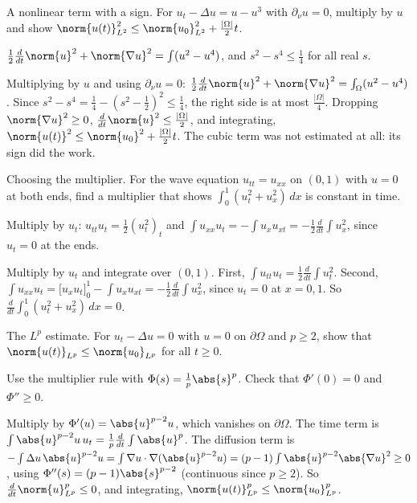 \begin{exercise}
  A nonlinear term with a sign. For $u_t - \Delta u = u - u^3$ with $\partial_\nu u = 0$, multiply by $u$ and show $\norm{u(t)}_{L^2}^2 \le \norm{u_0}_{L^2}^2 + \frac{|\Omega|}{2}t$.
  \begin{hint}
    $\frac12\frac{d}{dt}\norm{u}^2 + \norm{\nabla u}^2 = \int(u^2 - u^4)$, and $s^2 - s^4 \le \frac14$ for all real $s$.
  \end{hint}
  \begin{solution}
    Multiplying by $u$ and using $\partial_\nu u = 0$: $\frac12\frac{d}{dt}\norm{u}^2 + \norm{\nabla u}^2 = \int_\Omega(u^2 - u^4)$. Since $s^2 - s^4 = \frac14 - (s^2 - \frac12)^2 \le \frac14$, the right side is at most $\frac{|\Omega|}{4}$. Dropping $\norm{\nabla u}^2 \ge 0$, $\frac{d}{dt}\norm{u}^2 \le \frac{|\Omega|}{2}$, and integrating, $\norm{u(t)}^2 \le \norm{u_0}^2 + \frac{|\Omega|}{2}t$. The cubic term was not estimated at all: its sign did the work.
  \end{solution}
\end{exercise}

\begin{exercise}
  Choosing the multiplier. For the wave equation $u_{tt} = u_{xx}$ on $(0,1)$ with $u = 0$ at both ends, find a multiplier that shows $\int_0^1 (u_t^2 + u_x^2)\,dx$ is constant in time.
  \begin{hint}
    Multiply by $u_t$: $u_{tt}u_t = \frac12(u_t^2)_t$ and $\int u_{xx}u_t = -\int u_x u_{xt} = -\frac12\frac{d}{dt}\int u_x^2$, since $u_t = 0$ at the ends.
  \end{hint}
  \begin{solution}
    Multiply by $u_t$ and integrate over $(0,1)$. First, $\int u_{tt}u_t = \frac12\frac{d}{dt}\int u_t^2$. Second, $\int u_{xx}u_t = \big[u_xu_t\big]_0^1 - \int u_xu_{xt} = -\frac12\frac{d}{dt}\int u_x^2$, since $u_t = 0$ at $x = 0, 1$. So $\frac{d}{dt}\int_0^1(u_t^2 + u_x^2)\,dx = 0$.
  \end{solution}
\end{exercise}

\begin{exercise}
  The $L^p$ estimate. For $u_t - \Delta u = 0$ with $u = 0$ on $\partial\Omega$ and $p \ge 2$, show that $\norm{u(t)}_{L^p} \le \norm{u_0}_{L^p}$ for all $t \ge 0$.
  \begin{hint}
    Use the multiplier rule with $\Phi(s) = \frac1p\abs{s}^p$. Check that $\Phi'(0) = 0$ and $\Phi'' \ge 0$.
  \end{hint}
  \begin{solution}
    Multiply by $\Phi'(u) = \abs{u}^{p-2}u$, which vanishes on $\partial\Omega$. The time term is $\int \abs{u}^{p-2}u\,u_t = \frac1p\frac{d}{dt}\int\abs{u}^p$. The diffusion term is $-\int \Delta u\,\abs{u}^{p-2}u = \int \nabla u\cdot\nabla(\abs{u}^{p-2}u) = (p-1)\int\abs{u}^{p-2}\abs{\nabla u}^2 \ge 0$, using $\Phi''(s) = (p-1)\abs{s}^{p-2}$ (continuous since $p \ge 2$). So $\frac{d}{dt}\norm{u}_{L^p}^p \le 0$, and integrating, $\norm{u(t)}_{L^p}^p \le \norm{u_0}_{L^p}^p$.
  \end{solution}
\end{exercise}

